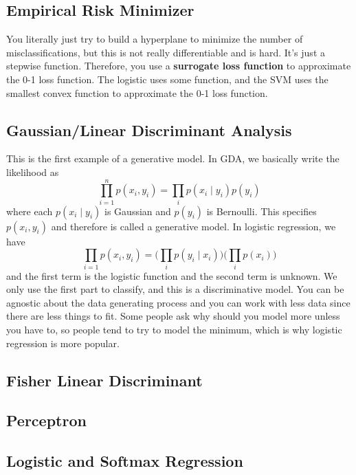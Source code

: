 \documentclass{article}
\begin{document}
  \subsection{Empirical Risk Minimizer} 

    You literally just try to build a hyperplane to minimize the number of misclassifications, but this is not really differentiable and is hard. It's just a stepwise function. Therefore, you use a \textbf{surrogate loss function} to approximate the 0-1 loss function. The logistic uses some function, and the SVM uses the smallest convex function to approximate the 0-1 loss function. 

  \subsection{Gaussian/Linear Discriminant Analysis}

    This is the first example of a generative model. In GDA, we basically write the likelihood as 
    \begin{equation}
      \prod_{i=1}^n p(x_i, y_i) = \prod_{i} p(x_i \mid y_i) p(y_i)
    \end{equation}
    where each $p(x_i \mid y_i)$ is Gaussian and $p(y_i)$ is Bernoulli. This specifies $p(x_i, y_i)$ and therefore is called a generative model. In logistic regression, we have 
    \begin{equation}
      \prod_{i=1} p(x_i, y_i) = \bigg( \prod_i p(y_i \mid x_i) \bigg) \bigg( \prod_i p(x_i) \bigg)
    \end{equation}
    and the first term is the logistic function and the second term is unknown. We only use the first part to classify, and this is a discriminative model. You can be agnostic about the data generating process and you can work with less data since there are less things to fit. Some people ask why should you model more unless you have to, so people tend to try to model the minimum, which is why logistic regression is more popular. 

  \subsection{Fisher Linear Discriminant} 

  \subsection{Perceptron}

  \subsection{Logistic and Softmax Regression} 
\end{document}
